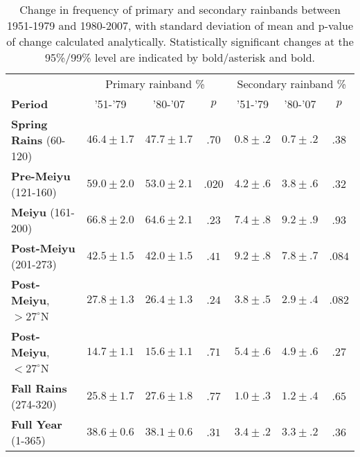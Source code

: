 \documentclass[draft,grl]{agutexSI}
\begin{document}
\begin{table}

\centering

\caption{Change in frequency of primary and secondary rainbands between 1951-1979 and 1980-2007, with standard deviation of mean and p-value of change calculated analytically. Statistically significant changes at the 95\%/99\% level are indicated by bold/asterisk and bold.}

\begin{tabular}{ l c c c c c c}
	& \multicolumn{3}{c}{Primary rainband \%} & \multicolumn{3}{c}{Secondary rainband \%} \\
	\textbf{Period} & '51-'79 & '80-'07 & $p$ & '51-'79 & '80-'07 & $p$ \\
	\hline	
	\textbf{Spring Rains} (60-120)		& $46.4 \pm 1.7$ & $47.7 \pm 1.7$ & $ .70 $ 	& $0.8 \pm .2$ & $0.7 \pm .2$ & $.38$ \\
	\textbf{Pre-Meiyu} (121-160) 		& $\boldsymbol{59.0 \pm 2.0}$ & $\boldsymbol{53.0 \pm 2.1}$ & $ \boldsymbol{.020} $ & $4.2 \pm .6$ & $3.8 \pm .6$ & $.32$ \\
	\textbf{Meiyu} (161-200)			& $66.8 \pm 2.0$ & $64.6 \pm 2.1$ & $ .23 $ 	& $7.4 \pm .8$ & $9.2 \pm .9$  & $.93$ \\
	\textbf{Post-Meiyu} (201-273)		& $42.5 \pm 1.5$ & $42.0 \pm 1.5$ & $ .41 $	& $9.2 \pm .8$ & $7.8 \pm .7$ & $.084$ \\
	\textbf{Post-Meiyu}, $>27^\circ$N 	& $27.8 \pm 1.3$ & $26.4 \pm 1.3$ & $ .24 $ 	& $3.8 \pm .5$ & $2.9 \pm .4$ & $.082$ \\
	\textbf{Post-Meiyu}, $<27^\circ$N 	& $14.7 \pm 1.1 $ & $15.6 \pm 1.1$ & $ .71 $ 	& $5.4 \pm .6$ & $4.9 \pm .6$ & $.27$  \\
	\textbf{Fall Rains} (274-320)			& $25.8 \pm 1.7 $ & $27.6 \pm 1.8$ & $ .77 $ 	& $1.0 \pm .3$ & $1.2 \pm .4$ & $.65$ \\
	\textbf{Full Year} (1-365)			& $38.6 \pm 0.6 $ & $38.1 \pm 0.6$ & $ .31 $ 	& $3.4 \pm .2$ & $3.3 \pm .2$ & $.36$ \\

\end{tabular}
\label{ts5}
\end{table}
\end{document}
